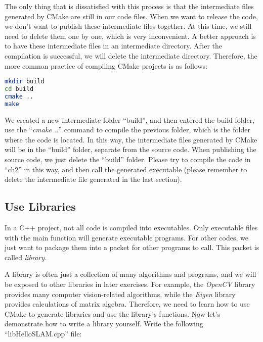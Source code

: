 The only thing that is dissatisfied with this process is that the intermediate files generated by CMake are still in our code files. When we want to release the code, we don't want to publish these intermediate files together. At this time, we still need to delete them one by one, which is very inconvenient. A better approach is to have these intermediate files in an intermediate directory. After the compilation is successful, we will delete the intermediate directory. Therefore, the more common practice of compiling CMake projects is as follows:
\begin{lstlisting}[language=sh,caption=Terminal input]
mkdir build
cd build
cmake ..
make
\end{lstlisting}
We created a new intermediate folder ``build'', and then entered the build folder, use the ``\textit{cmake ..}'' command to compile the previous folder, which is the folder where the code is located. In this way, the intermediate files generated by CMake will be in the ``build'' folder, separate from the source code. When publishing the source code, we just delete the ``build'' folder. Please try to compile the code in ``ch2'' in this way, and then call the generated executable (please remember to delete the intermediate file generated in the last section).

\subsection{Use Libraries}
In a C++ project, not all code is compiled into executables. Only executable files with the main function will generate executable programs. For other codes, we just want to package them into a packet for other programs to call. This packet is called \textit{library}.

A library is often just a collection of many algorithms and programs, and we will be exposed to other libraries in later exercises. For example, the \textit{OpenCV} library provides many computer vision-related algorithms, while the \textit{Eigen} library provides calculations of matrix algebra. Therefore, we need to learn how to use CMake to generate libraries and use the library's functions. Now let's demonstrate how to write a library yourself. Write the following ``libHelloSLAM.cpp'' file:


